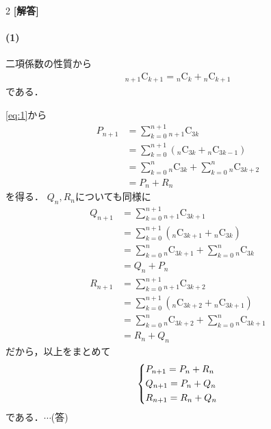 \documentclass[../../main.tex]{subfiles}
\begin{document}
\setcounter{equation}{0}
\begin{oframed}
  
\end{oframed}
\setlength{\columnseprule}{0.4pt}
\begin{multicols}{2}
  {\bf [解答]}

  \paragraph{(1)}
  二項係数の性質から
  \begin{align}
    {}_{n+1}\mathrm{C}_{k+1} = {}_n\mathrm{C}_k + {}_n\mathrm{C}_{k+1} \label{eq:1}
  \end{align}
  である．

  \cref{eq:1}から
  \begin{align}
    P_{n+1}
    & = \sum_{k=0}^{n+1} {}_{n+1}\mathrm{C}_{3k}                                      \\
    & = \sum_{k=0}^{n+1} \left({}_{n}\mathrm{C}_{3k} + {}_{n}\mathrm{C}_{3k-1}\right) \\
    & = \sum_{k=0}^{n} {}_{n}\mathrm{C}_{3k} + \sum_{k=0}^{n} {}_{n}\mathrm{C}_{3k+2} \\
    & = P_n + R_n
  \end{align}
  を得る．
  $Q_{n}, R_{n}$についても同様に
  \begin{align}
    Q_{n+1}
    & = \sum_{k=0}^{n+1} {}_{n+1}\mathrm{C}_{3k+1}                                      \\
    & = \sum_{k=0}^{n+1} \left({}_{n}\mathrm{C}_{3k+1} + {}_{n}\mathrm{C}_{3k}\right)   \\
    & = \sum_{k=0}^{n} {}_{n}\mathrm{C}_{3k+1} + \sum_{k=0}^{n} {}_{n}\mathrm{C}_{3k}   \\
    & = Q_n + P_n                                                                       \\
    R_{n+1}
    & = \sum_{k=0}^{n+1} {}_{n+1}\mathrm{C}_{3k+2}                                      \\
    & = \sum_{k=0}^{n+1} \left({}_{n}\mathrm{C}_{3k+2} + {}_{n}\mathrm{C}_{3k+1}\right) \\
    & = \sum_{k=0}^{n} {}_{n}\mathrm{C}_{3k+2} + \sum_{k=0}^{n} {}_{n}\mathrm{C}_{3k+1} \\
    & = R_n + Q_n
  \end{align}
  だから，以上をまとめて
  \begin{align}
    \begin{dcases}
      P_{n+1}  = P_n + R_n \\
      Q_{n+1}  = P_n + Q_n \\
      R_{n+1}  = R_n + Q_n
    \end{dcases} \label{eq:2}
  \end{align}
  である．$\cdots$(答)


\end{multicols}
\end{document}
